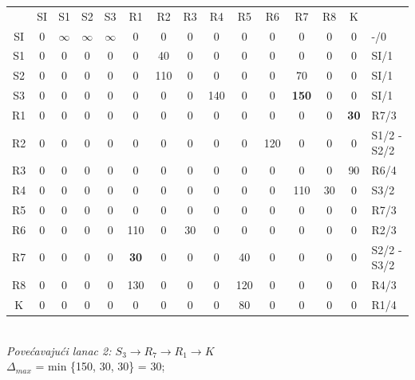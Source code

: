 \documentclass[12pt]{article}
\begin{document}
\begin{enumerate}
\begin{center}
\begin{tabular}{|c|c|c|c|c|c|c|c|c|c|c|c|c|c|l}
\cline{1-14}
 & SI & S1 & S2 & S3 & R1 & R2 & R3 & R4 & R5 & R6 & R7 & R8 & K &  \\ \cline{1-14}
SI & 0 & $\infty$ & $\infty$ & $\infty$ & 0 & 0 & 0 & 0 & 0 & 0 & 0 & 0 & 0 & -/0 \\ \cline{1-14}
S1 & 0 & 0 & 0 & 0 & 0 & 40 & 0 & 0 & 0 & 0 & 0 & 0 & 0 & SI/1 \\ \cline{1-14}
S2 & 0 & 0 & 0 & 0 & 0 & 110 & 0 & 0 & 0 & 0 & 70 & 0 & 0 & SI/1 \\ \cline{1-14}
S3 & 0 & 0 & 0 & 0 & 0 & 0 & 0 & 140 & 0 & 0 & \textbf{150} & 0 & 0 & SI/1 \\ \cline{1-14}
R1 & 0 & 0 & 0 & 0 & 0 & 0 & 0 & 0 & 0 & 0 & 0 & 0 & \textbf{30} & R7/3 \\ \cline{1-14}
R2 & 0 & 0 & 0 & 0 & 0 & 0 & 0 & 0 & 0 & 120 & 0 & 0 & 0 & S1/2 - S2/2 \\ \cline{1-14}
R3 & 0 & 0 & 0 & 0 & 0 & 0 & 0 & 0 & 0 & 0 & 0 & 0 & 90 & R6/4 \\ \cline{1-14}
R4 & 0 & 0 & 0 & 0 & 0 & 0 & 0 & 0 & 0 & 0 & 110 & 30 & 0 & S3/2 \\ \cline{1-14}
R5 & 0 & 0 & 0 & 0 & 0 & 0 & 0 & 0 & 0 & 0 & 0 & 0 & 0 & R7/3 \\ \cline{1-14}
R6 & 0 & 0 & 0 & 0 & 110 & 0 & 30 & 0 & 0 & 0 & 0 & 0 & 0 & R2/3 \\ \cline{1-14}
R7 & 0 & 0 & 0 & 0 & \textbf{30} & 0 & 0 & 0 & 40 & 0 & 0 & 0 & 0 & S2/2 - S3/2 \\ \cline{1-14}
R8 & 0 & 0 & 0 & 0 & 130 & 0 & 0 & 0 & 120 & 0 & 0 & 0 & 0 & R4/3 \\ \cline{1-14}
K & 0 & 0 & 0 & 0 & 0 & 0 & 0 & 0 & 80 & 0 & 0 & 0 & 0 & R1/4 \\ \cline{1-14}
\end{tabular}\\
\vspace{0.5cm}
\textit{Povećavajući lanac 2: $S_3 \rightarrow R_7 \rightarrow R_1 \rightarrow K$}\\
$\Delta_{max}$ = min \{150, 30, 30\} = 30;\\
\vspace{0.5cm}



\end{center}
\end{enumerate}
\end{document}
